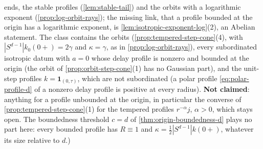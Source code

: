 \begin{proposition}
{ends, the stable profiles (\ref{lem:stable-tail}) and the orbits with a logarithmic exponent
(\ref{prop:log-orbit-rays}); the missing link, that a profile bounded at the origin has a
logarithmic exponent, is \ref{lem:isotropic-exponent-log}(2), an Abelian statement. The class
contains the \Matern{} orbits (\ref{prop:tempered-step-cone}(4), with
$|S^{d-1}|k_0(0{+}) = 2\gamma$ and $\kappa = \gamma$, as in \ref{prop:log-orbit-rays}), every
subordinated isotropic datum with $a = 0$ whose delay profile is nonzero and bounded at the origin
(the orbit of \ref{prop:orbit-step-cone}(1) has no Gaussian part), and the unit-step
profiles $k = \mathbf{1}_{(0,\tau)}$, which are not subordinated (a polar profile
\ref{eq:polar-profile-d} of a nonzero delay profile is positive at every radius). \textbf{Not claimed}: anything for a profile unbounded at the origin, in particular
the converse of \ref{prop:tempered-step-cone}(1) for the tempered profiles $r^{-\alpha}j$,
$\alpha > 0$, which stays open. The boundedness threshold $c = d$ of
\ref{thm:origin-boundedness-d} plays no part here: every bounded profile has $R \equiv 1$ and
$\kappa = \tfrac12|S^{d-1}|k(0{+})$, whatever its size relative to $d$.)}
\end{proposition}

